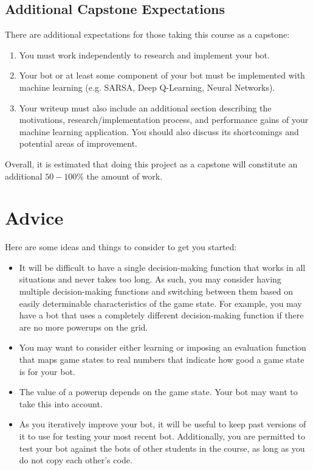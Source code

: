\documentclass{article}
\begin{document}
\subsection{Additional Capstone Expectations}
There are additional expectations for those taking this course as a capstone:
\begin{enumerate}
    \item You must work independently to research and implement your bot.
    \item Your bot or at least some component of your bot must be implemented with machine learning (e.g. SARSA, Deep Q-Learning, Neural Networks).
    \item Your writeup must also include an additional section describing the motivations, research/implementation process, and performance gains of your machine learning application. You should also discuss its shortcomings and potential areas of improvement. 
\end{enumerate} 

Overall, it is estimated that doing this project as a capstone will constitute an additional $50-100\%$ the amount of work.

\section{Advice}
Here are some ideas and things to consider to get you started:

\begin{itemize}
\item It will be difficult to have a single decision-making function that works in all situations and never takes too long.
As such, you may consider having multiple decision-making functions and switching between them based on easily determinable characteristics of the game state.
For example, you may have a bot that uses a completely different decision-making function if there are no more powerups on the grid.

\item You may want to consider either learning or imposing an evaluation function that maps game states to real numbers that indicate how good a game state is for your bot.

\item The value of a powerup depends on the game state.
Your bot may want to take this into account.

\item As you iteratively improve your bot, it will be useful to keep past versions of it to use for testing your most recent bot.
Additionally, you are permitted to test your bot against the bots of other students in the course, as long as you do not copy each other's code.
\end{itemize}
\end{document}
